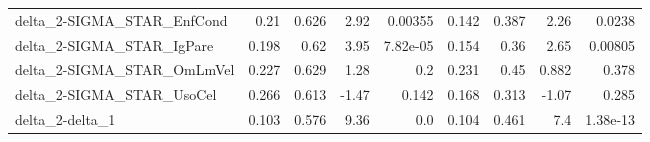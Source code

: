 \begin{tabular}{lrrrrrrrr}
delta\_2-SIGMA\_STAR\_EnfCond            &        0.21 &        0.626 &    2.92 &  0.00355 &      0.142 &       0.387 &         2.26 &        0.0238 \\
delta\_2-SIGMA\_STAR\_IgPare             &       0.198 &         0.62 &    3.95 & 7.82e-05 &      0.154 &        0.36 &         2.65 &       0.00805 \\
delta\_2-SIGMA\_STAR\_OmLmVel            &       0.227 &        0.629 &    1.28 &      0.2 &      0.231 &        0.45 &        0.882 &         0.378 \\
delta\_2-SIGMA\_STAR\_UsoCel             &       0.266 &        0.613 &   -1.47 &    0.142 &      0.168 &       0.313 &        -1.07 &         0.285 \\
delta\_2-delta\_1                       &       0.103 &        0.576 &    9.36 &      0.0 &      0.104 &       0.461 &          7.4 &      1.38e-13 \\
\bottomrule
\end{tabular}
